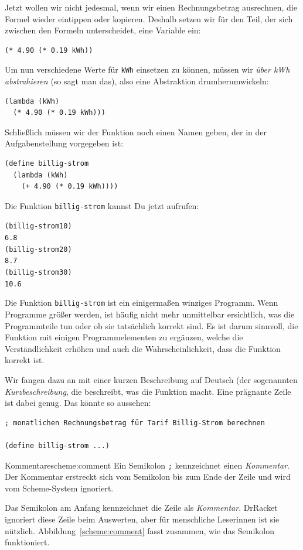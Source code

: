 %
Jetzt wollen wir nicht jedesmal, wenn wir einen Rechnungsbetrag
ausrechnen, die Formel wieder eintippen oder kopieren.  Deshalb setzen
wir für den Teil, der sich zwischen den Formeln unterscheidet, eine
Variable ein:
%
\begin{verbatim}
(* 4.90 (* 0.19 kWh))
\end{verbatim}
%
Um nun verschiedene Werte für \texttt{kWh} einsetzen zu können, müssen
wir \emph{über kWh abstrahieren}  (so sagt man
das), also eine Abstraktion drumherumwickeln:
%
\begin{verbatim}
(lambda (kWh)
  (* 4.90 (* 0.19 kWh)))
\end{verbatim}
%
Schließlich müssen wir der Funktion noch einen Namen geben, der in
der Aufgabenstellung vorgegeben ist:
%
\begin{verbatim}
(define billig-strom
  (lambda (kWh)
    (+ 4.90 (* 0.19 kWh))))
\end{verbatim}
%
Die Funktion \texttt{billig-strom} kannst Du jetzt aufrufen:
%
\begin{alltt}
(billig-strom 10)
\evalsto{} 6.8
(billig-strom 20)
\evalsto{} 8.7
(billig-strom 30)
\evalsto{} 10.6
\end{alltt}
%
Die Funktion \texttt{billig-strom} ist ein einigermaßen winziges
Programm.  Wenn Programme größer werden, ist häufig nicht mehr
unmittelbar ersichtlich, was die Programmteile tun oder ob sie
tatsächlich korrekt sind.  Es ist darum sinnvoll, die Funktion mit
einigen Programmelementen zu ergänzen, welche die Verständlichkeit
erhöhen und auch die Wahrscheinlichkeit, dass die Funktion korrekt
ist.

Wir fangen dazu an mit einer kurzen Beschreibung auf Deutsch (der
sogenannten \textit{Kurzbeschreibung}, die
beschreibt, was die Funktion macht.  Eine prägnante Zeile ist dabei
genug.  Das könnte so aussehen:
%
\begin{verbatim}
; monatlichen Rechnungsbetrag für Tarif Billig-Strom berechnen

(define billig-strom ...)
\end{verbatim}
%
\begin{feature}{Kommentare}{scheme:comment}
  Ein Semikolon \texttt{;} kennzeichnet einen 
  \textit{Kommentar}.  Der Kommentar erstreckt sich
  vom Semikolon bis zum Ende der Zeile und wird vom Scheme-System
  ignoriert.
\end{feature}
%
Das Semikolon am Anfang kennzeichnet die Zeile als
\textit{Kommentar}. DrRacket ignoriert diese Zeile
beim Auswerten, aber für menschliche Leserinnen ist sie nützlich.
Abbildung~\ref{scheme:comment} fasst zusammen, wie das Semikolon
funktioniert.

